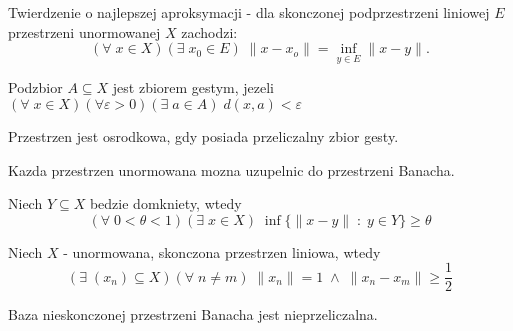 \begin{multicols}{2}
    {\color{def}Twierdzenie o najlepszej aproksymacji} - dla skonczonej podprzestrzeni liniowej $E$ przestrzeni unormowanej $X$ zachodzi:
    $$(\forall\;x\in X)(\exists\;x_0\in E)\;\|x-x_o\|=\inf\limits_{y\in E}\|x-y\|.$$

    \bigskip

    \pdef

    Podzbior $A\subseteq X$ jest zbiorem {\color{def}gestym}, jezeli\\
    $(\forall\;x\in X)(\forall\varepsilon>0)(\exists\;a\in A)\;d(x,a)<\varepsilon$
    \medskip

    Przestrzen jest {\color{def}osrodkowa}, gdy posiada przeliczalny zbior gesty.


    \kdef

    Kazda przestrzen unormowana mozna uzupelnic do przestrzeni Banacha.
    \medskip

    Niech $Y\subseteq X$ bedzie domkniety, wtedy
    $$(\forall\;0<\theta<1)(\exists\;x\in X)\;\inf\{\|x-y\|\;:\;y\in Y\}\geq\theta$$

    Niech $X$ - unormowana, skonczona przestrzen liniowa, wtedy
    $$(\exists\;(x_n)\subseteq X)(\forall\;n\neq m)\;\|x_n\|=1\;\land\;\|x_n-x_m\|\geq \frac12$$

    Baza nieskonczonej przestrzeni Banacha jest nieprzeliczalna.

\end{multicols}